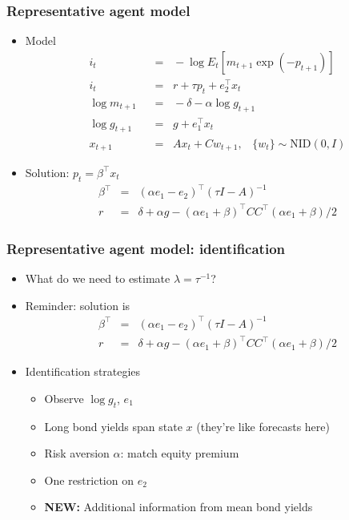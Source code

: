 \documentclass{beamer}
\begin{document}
\begin{frame}
\frametitle{Representative agent model}
\begin{itemize} \itemsep=\bigskipamount
\item Model
\begin{align*}
    i_t &\;\;=\;\;  - \log E_t \left[ m_{t+1} \exp(-p_{t+1}) \right]
                \tag{Euler equation} \\
    i_t &\;\;=\;\;  r + \tau p_{t} +  e_2^\top x_{t} \tag{Taylor rule} \\
    \log m_{t+1} &\;\;=\;\; - \delta - \alpha \log g_{t+1}  \\
    \log g_{t+1} &\;\;=\;\; g + e_1^\top x_t \\
    x_{t+1} &\;\;=\;\; A x_{t} + C w_{t+1},
            \;\;\;\{ w_t \} \sim \mbox{NID}(0,I)
\end{align*}

\item Solution:  $ p_t = \beta^\top x_t $
\begin{eqnarray*}
    \beta^\top &=& (\alpha e_1 - e_2)^\top (\tau I - A)^{-1} \\
    r &=& \delta + \alpha g - (\alpha e_1 + \beta)^\top C C^\top (\alpha e_1 + \beta)/2
\end{eqnarray*}
\end{itemize}
\end{frame}

\begin{frame}
\frametitle{Representative agent model: identification}
\begin{itemize} \itemsep=\bigskipamount
\item What do we need to estimate $\lambda = \tau^{-1}$?
\item Reminder:   solution is
\begin{eqnarray*}
    \beta^\top &=& (\alpha e_1 - e_2)^\top (\tau I - A)^{-1} \\
    r &=& \delta + \alpha g - (\alpha e_1 + \beta)^\top C C^\top (\alpha e_1 + \beta)/2
\end{eqnarray*}
\item Identification strategies \\
\begin{itemize}
\item Observe $\log g_{t}$, $e_1$
\item Long bond yields span state $x$ (they're like forecasts here)
\item Risk aversion $\alpha$:  match equity premium
\item One restriction on $e_2$
\item {\bf NEW:} Additional information from mean bond yields
\end{itemize}
\end{itemize}
\end{frame}
\end{document}
